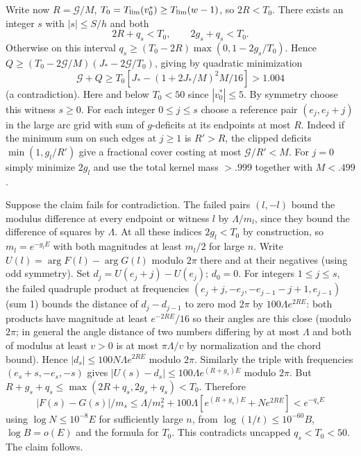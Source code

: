 \documentclass[11pt]{article}
\begin{document}
Write now \(R=\mathcal G/M\), \(T_0=T_{\rm lim}(v_0^*)\ge T_{\rm lim}(w-1)\), so \(2R<T_0\). There exists an integer \(s\) with \(|s|\le S/h\) and both
\[
 2R+q_s<T_0,\qquad 2g_s+q_s<T_0.
\]
Otherwise on this interval \(q_s\ge (T_0-2R)\max(0,1-2g_s/T_0)\). Hence \(Q\ge(T_0-2\mathcal G/M)(J_*-2\mathcal G/T_0)\), giving by quadratic minimization
\[
 \mathcal G+Q\ge T_0[J_*-(1+2J_*/M)^2 M/16]>1.004
\]
(a contradiction). Here and below \(T_0<50\) since \(|v_0^*|\le5\). By symmetry choose this witness \(s\ge0\). For each integer \(0\le j\le s\) choose a reference pair \((e_j,e_j+j)\) in the large arc grid with sum of \(g\)-deficits at its endpoints at most \(R\). Indeed if the minimum sum on such edges at \(j\ge1\) is \(R'>R\), the clipped deficits \(\min(1,g_l/R')\) give a fractional cover costing at most \(\mathcal G/R'<M\). For \(j=0\) simply minimize \(2g_l\) and use the total kernel mass \(>.999\) together with \(M<.499\).

Suppose the claim fails for contradiction. The failed pairs \((l,-l)\) bound the modulus difference at every endpoint or witness \(l\) by \(\Lambda/m_l\), since they bound the difference of squares by \(\Lambda\). At all these indices \(2g_l<T_0\) by construction, so \(m_l=e^{-g_l E}\) with both magnitudes at least \(m_l/2\) for large \(n\). Write \(U(l)=\arg F(l)-\arg G(l)\) modulo \(2\pi\) there and at their negatives (using odd symmetry). Set \(d_j=U(e_j+j)-U(e_j)\); \(d_0=0\). For integers $1\le j\le s$, the failed quadruple product at frequencies \((e_j+j,-e_j,-e_{j-1}-j+1,e_{j-1})\) (sum 1) bounds the distance of \(d_j-d_{j-1}\) to zero mod \(2\pi\) by \(100\Lambda e^{2R E}\): both products have magnitude at least \(e^{-2RE}/16\) so their angles are this close (modulo $2\pi$; in general the angle distance of two numbers differing by at most $\Lambda$ and both of modulus at least $v>0$ is at most $\pi\Lambda/v$ by normalization and the chord bound). Hence \(|d_s|\le 100N\Lambda e^{2R E}\) modulo \(2\pi\). Similarly the triple with frequencies \((e_s+s,-e_s,-s)\) gives \(|U(s)-d_s|\le100\Lambda e^{(R+g_s)E}\) modulo \(2\pi\). But \(R+g_s+q_s\le\max(2R+q_s,2g_s+q_s)<T_0\). Therefore
\[
 |F(s)-G(s)|/m_s\le \Lambda/m_s^2 +100\Lambda[e^{(R+g_s)E}+N e^{2R E}]<e^{-q_s E}
\]
using \(\log N\le 10^{-8} E\) for sufficiently large \(n\), from \(\log(1/t)\le10^{-60} B\), \(\log B=o(E)\) and the formula for \(T_0\). This contradicts uncapped \(q_s<T_0<50\). The claim follows.
\end{document}
